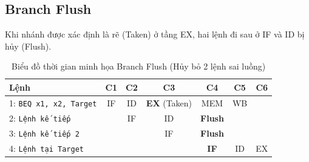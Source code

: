\subsection{Branch Flush}
Khi nhánh được xác định là rẽ (Taken) ở tầng EX, hai lệnh đi sau ở IF và ID bị hủy (Flush).
\begin{table}[H]
\centering
\begin{tabular}{|l|c|c|c|c|c|c|}
\hline
\textbf{Lệnh} & \textbf{C1} & \textbf{C2} & \textbf{C3} & \textbf{C4} & \textbf{C5} & \textbf{C6} \\
\hline
1: \texttt{BEQ x1, x2, Target} & IF & ID & \textbf{EX} (Taken) & MEM & WB & \\
\hline
2: \texttt{Lệnh kế tiếp} & & IF & ID & \textbf{Flush} & & \\
\hline
3: \texttt{Lệnh kế tiếp 2} & & & IF & \textbf{Flush} & & \\
\hline
4: \texttt{Lệnh tại Target} & & & & \textbf{IF} & ID & EX \\
\hline
\end{tabular}
\caption{Biểu đồ thời gian minh họa Branch Flush (Hủy bỏ 2 lệnh sai luồng)}
\label{fig:branch_flush_wave}
\end{table}
